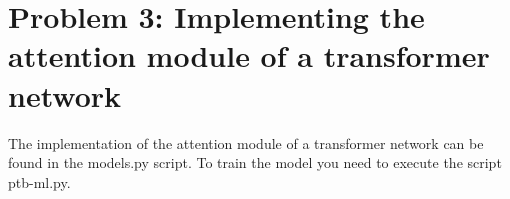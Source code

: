 \section{Problem 3: Implementing the attention module of a transformer network}

The implementation of the attention module of a transformer network can be found in the models.py script. To train the model you need to execute the script ptb-ml.py.
